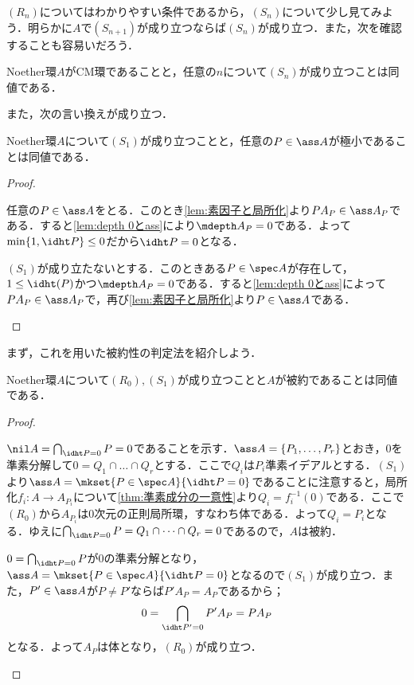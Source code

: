 $(R_n)$についてはわかりやすい条件であるから，$(S_n)$について少し見てみよう．明らかに$A$で$(S_{n+1})$が成り立つならば$(S_n)$が成り立つ．また，次を確認することも容易いだろう．

\begin{prop}
	Noether環$A$がCM環であることと，任意の$n$について$(S_n)$が成り立つことは同値である．
\end{prop}

また，次の言い換えが成り立つ．
\begin{lem}
	Noether環$A$について$(S_1)$が成り立つことと，任意の$P\in\ass A$が極小であることは同値である．
\end{lem}

\begin{proof}
	\begin{eqv}
		\item
			任意の$P\in\ass A$をとる．このとき\ref{lem:素因子と局所化}より$PA_P\in\ass A_P$である．すると\ref{lem:depth 0とass}により$\mdepth A_P=0$である．よって$\min\{1,\idht P\}\leq0$だから$\idht P=0$となる．
		\item
			$(S_1)$が成り立たないとする．このときある$P\in\spec A$が存在して，$1\leq\idht(P)$かつ$\mdepth A_P=0$である．すると\ref{lem:depth 0とass}によって$PA_P\in\ass A_P$で，再び\ref{lem:素因子と局所化}より$P\in\ass A$である．
	\end{eqv}
\end{proof}

まず，これを用いた被約性の判定法を紹介しよう．

\begin{thm}
	Noether環$A$について$(R_0),(S_1)$が成り立つことと$A$が被約であることは同値である．
\end{thm}

\begin{proof}
	\begin{eqv}
		\item $\nil A=\bigcap_{\idht P=0}P=0$であることを示す．$\ass A=\{P_1,\dots,P_r\}$とおき，$0$を準素分解して$0=Q_1\cap\dots\cap Q_r$とする．ここで$Q_i$は$P_i$準素イデアルとする．$(S_1)$より$\ass A=\mkset{P\in\spec A}{\idht P=0}$であることに注意すると，局所化$f_i:A\to A_{P_i}$について\ref{thm:準素成分の一意性}より$Q_i=f_i^{-1}(0)$である．ここで$(R_0)$から$A_{P_i}$は$0$次元の正則局所環，すなわち体である．よって$Q_i=P_i$となる．ゆえに$\bigcap_{\idht P=0}P=Q_1\cap\dots\cap Q_r=0$であるので，$A$は被約． 
		\item $0=\bigcap_{\idht P=0}P$が$0$の準素分解となり，$\ass A=\mkset{P\in\spec A}{\idht P=0}$となるので$(S_1)$が成り立つ．また，$P'\in\ass A$が$P\neq P'$ならば$P'A_P=A_P$であるから；
		\[0=\bigcap_{\idht P'=0}P'A_P=PA_P\]
		となる．よって$A_P$は体となり，$(R_0)$が成り立つ．
	\end{eqv}
\end{proof}

